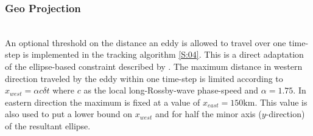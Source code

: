 \subsubsection{Geo Projection}\label{filter:projLocs}
\\
An optional threshold on the distance an eddy is allowed to travel over one time-step is implemented in the tracking algorithm \ref{S:04}. This is a direct adaptation of the ellipse-based constraint described by \cite{chelton2011}. The maximum distance in western direction traveled by the eddy within one time-step is limited according to $x_{west} = \alpha c \delta{t} $ where $c$ as the local long-Rossby-wave phase-speed and \eg $\alpha=1.75$. In eastern direction the maximum is fixed at a value of \eg $x_{east} = 150\mathrm{km}$. This value is also used to put a lower bound on $x_{west}$ and for half the minor axis ($y$-direction) of the resultant ellipse.    

















